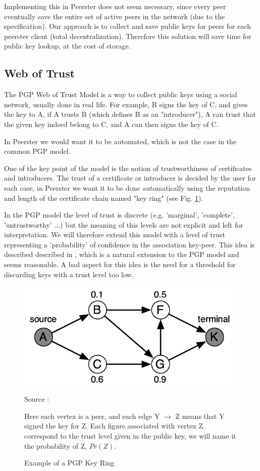 \documentclass[]{article}
\begin{document}
Implementing this in Peerster does not seem necessary, since every peer eventually save the entire set of active peers in the network (due to the specification). Our approach is to collect and save public keys for peers for each peerster client (total decentralization). Therefore this solution will save time for public key lookup, at the cost of storage.

\subsection{Web of Trust}
The PGP Web of Trust Model \cite{abdul1997pgp} is a way to collect public keys using a social network, usually done in real life. For example, B signs the key of C, and gives the key to A, if A trusts B (which defines B as an "introducer"), A can trust that the given key indeed belong to C, and A can then signs the key of C. 

In Peerster we would want it to be automated, which is not the case in the common PGP model. 

One of the key point of the model is the notion of trustworthiness of certificates and introducers. The trust of a certificate or introducer is decided by the user for each case, in Peerster we want it to be done automatically using the reputation and length of the certificate chain named "key ring" (see Fig. \ref{fig:pgp-key-ring}).

In the PGP model the level of trust is discrete (e.g. 'marginal', 'complete', 'untrustworthy' ...) but the meaning of this levels are not explicit and left for interpretation. We will therefore extend this model with a level of trust representing a 'probability' of confidence in the association key-peer. This idea is described described in \cite{haenni2007new}, which is a natural extension to the PGP model and seems reasonable.
A bad aspect for this idea is the need for a threshold for discarding keys with a trust level too low.

\begin{figure}[h]
\includegraphics{pgp-key-ring}
\centering
\caption{Example of a PGP Key Ring}
\label{fig:pgp-key-ring}
Source : \cite{haenni2007new}

Here each vertex is a peer, and each edge Y $\rightarrow$ Z means that Y signed the key for Z.
Each figure associated with vertex Z  correspond to the trust level given in the public key, we will name it the probability of Z, $Pr(Z)$.
\end{figure}
\end{document}
